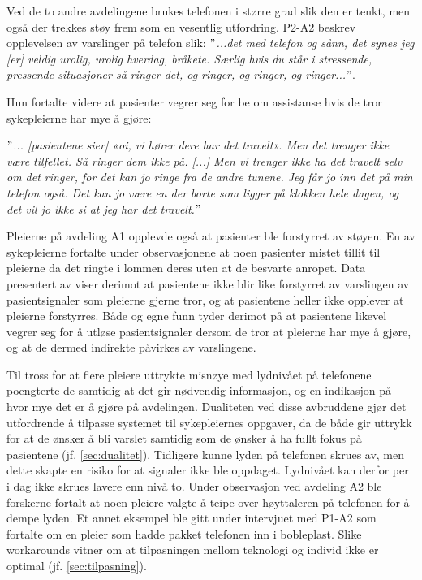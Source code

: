 \noindent
Ved de to andre avdelingene brukes telefonen i større grad slik den er tenkt, men også der trekkes støy frem som en vesentlig utfordring. P2-A2 beskrev opplevelsen av varslinger på telefon slik: \textit{ $"$...det med telefon og sånn, det synes jeg [er] veldig urolig, urolig hverdag, bråkete. Særlig hvis du står i stressende, pressende situasjoner så ringer det, og ringer, og ringer, og ringer...$"$}. 

\noindent
Hun fortalte videre at pasienter vegrer seg for be om assistanse hvis de tror sykepleierne har mye å gjøre:

\noindent
\textit{$"$... [pasientene sier] «oi, vi hører dere har det travelt». Men det trenger ikke være tilfellet. Så ringer dem ikke på. [...] Men vi trenger ikke ha det travelt selv om det ringer, for det kan jo ringe fra de andre tunene. Jeg får jo inn det på min telefon også. Det kan jo være en der borte som ligger på klokken hele dagen, og det vil jo ikke si at jeg har det travelt.$"$}

\noindent
Pleierne på avdeling A1 opplevde også at pasienter ble forstyrret av støyen. En av sykepleierne fortalte under observasjonene at noen pasienter mistet tillit til pleierne da det ringte i lommen deres uten at de besvarte anropet. Data presentert av \citet{Rygh13} viser derimot at pasientene ikke blir like forstyrret av varslingen av pasientsignaler som pleierne gjerne tror, og at pasientene heller ikke opplever at pleierne forstyrres. Både \citet{Rygh13} og egne funn tyder derimot på at pasientene likevel vegrer seg for å utløse pasientsignaler dersom de tror at pleierne har mye å gjøre, og at de dermed indirekte påvirkes av varslingene.

\noindent
Til tross for at flere pleiere uttrykte misnøye med lydnivået på telefonene poengterte de samtidig at det gir nødvendig informasjon, og en indikasjon på hvor mye det er å gjøre på avdelingen. Dualiteten ved disse avbruddene gjør det utfordrende å tilpasse systemet til sykepleiernes oppgaver, da de både gir uttrykk for at de ønsker å bli varslet samtidig som de ønsker å ha fullt fokus på pasientene (jf. \ref{sec:dualitet}). Tidligere kunne lyden på telefonen skrues av, men dette skapte en risiko for at signaler ikke ble oppdaget. Lydnivået kan derfor per i dag ikke skrues lavere enn nivå to. Under observasjon ved avdeling A2 ble forskerne fortalt at noen pleiere valgte å teipe over høyttaleren på telefonen for å dempe lyden. Et annet eksempel ble gitt under intervjuet med P1-A2 som fortalte om en pleier som hadde pakket telefonen inn i bobleplast. Slike workarounds vitner om at tilpasningen mellom teknologi og individ ikke er optimal (jf. \ref{sec:tilpasning}).

